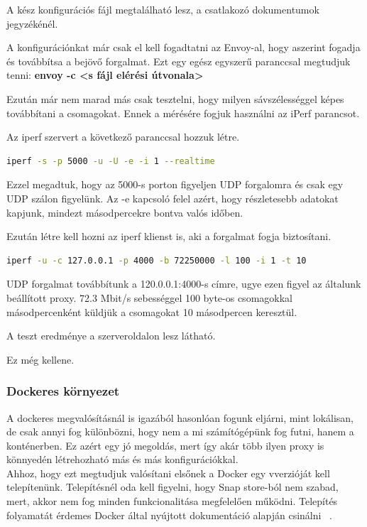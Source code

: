 \documentclass[a4paper,oneside]{article}
\begin{document}
A kész konfigurációs fájl megtalálható lesz, a csatlakozó dokumentumok jegyzékénél.

A konfigurációnkat már csak el kell fogadtatni az Envoy-al, hogy aszerint
fogadja és továbbítsa a bejövő forgalmat. Ezt egy egész egyszerű paranccsal
megtudjuk tenni: \textbf{envoy -c <s fájl elérési útvonala>}

Ezután már nem marad más csak tesztelni, hogy milyen sávszélességgel képes
továbbítani a csomagokat. Ennek a mérésére fogjuk használni az iPerf parancsot.

Az iperf szervert a következő paranccsal hozzuk létre.
\begin{lstlisting}[language=bash]
   iperf -s -p 5000 -u -U -e -i 1 --realtime
\end{lstlisting}
Ezzel megadtuk, hogy az 5000-s porton figyeljen UDP forgalomra és csak egy UDP
szálon figyelünk. Az -e kapcsoló felel azért, hogy részletesebb adatokat kapjunk,
mindezt másodpercekre bontva valós időben.

Ezután létre kell hozni az iperf klienst is, aki a forgalmat fogja biztosítani.
\begin{lstlisting}[language=bash]
  iperf -u -c 127.0.0.1 -p 4000 -b 72250000 -l 100 -i 1 -t 10
\end{lstlisting}
UDP forgalmat továbbítunk a 120.0.0.1:4000-s címre, ugye ezen figyel az
általunk beállított proxy. 72.3 Mbit/s sebességgel 100 byte-os csomagokkal
másodpercenként küldjük a csomagokat 10 másodpercen keresztül.

A teszt eredménye a szerveroldalon lesz látható.

Ez még kellene.
\subsubsection{Dockeres környezet}
A dockeres megvalósításnál is igazából hasonlóan fogunk eljárni, mint lokálisan, de
csak annyi fog különbözni, hogy nem a mi számítógépünk fog futni, hanem a konténerben.
Ez azért egy jó megoldás, mert így akár több ilyen proxy is könnyedén létrehozható
más és más konfigurációkkal. \\

Ahhoz, hogy ezt megtudjuk valósítani elsőnek a Docker egy vverzióját kell
telepítenünk. Telepítésnél oda kell figyelni, hogy Snap store-ból nem szabad,
mert, akkor nem fog minden funkcionalitása megfelelően működni. Telepítés
folyamatát érdemes Docker által nyújtott dokumentáció alapján csinálni ~\cite{installdocker}.
\end{document}
